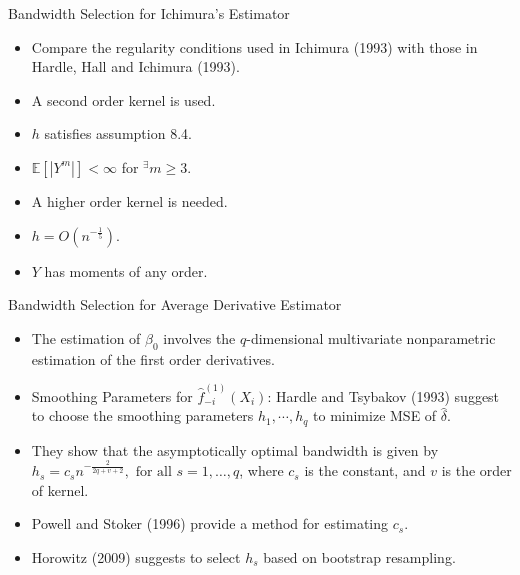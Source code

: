 \documentclass[xcolor=svgnames,dvipdfmx,cjk]{beamer}
\theoremstyle{example}
\def\E{\mathbb{E}}
\begin{document}
\begin{frame}{Bandwidth Selection for Ichimura's Estimator}
  \begin{itemize}
    \item Compare the regularity conditions used in Ichimura (1993) with those in Hardle, Hall and Ichimura (1993).
  \end{itemize}
  \begin{minipage}{0.49\textwidth}  %
    \begin{tcolorbox}[colframe=red!50!white, colback=red!10!white, title=Ichimura (1993)]
        \begin{itemize}
          \item A second order kernel is used.
          \item $h$ satisfies assumption 8.4.
          \item $\E[|Y^m|]<\infty$ for $^\exists m \geq 3$.
        \end{itemize}
    \end{tcolorbox}
  \end{minipage}%
  \hfill
  \begin{minipage}{0.49\textwidth}  %
    \begin{tcolorbox}[colframe=red!50!white, colback=red!10!white, title=HHI (1993)]
        \begin{itemize}
            \item A higher order kernel is needed.
            \item $h = O(n^{-\frac{1}{5}})$.
            \item $Y$ has moments of any order.
        \end{itemize}
    \end{tcolorbox}
  \end{minipage} 
\end{frame}

\begin{frame}{Bandwidth Selection for Average Derivative Estimator}
\begin{itemize}
  \item The estimation of $\beta_0$ involves 
        the $q$-dimensional multivariate nonparametric estimation of the first order derivatives.
  \item \alert{Smoothing Parameters for $\hat{f}_{-i}^{(1)}(X_i)$}: 
        Hardle and Tsybakov (1993) suggest 
        to choose the smoothing parameters $h_1, \cdots, h_q$ 
        to minimize MSE of $\hat{\delta}$.
  \item They show that the asymptotically optimal bandwidth is given by 
        $h_s = c_s n^{-\frac{2}{2q+v+2}}, \text{ for all } s = 1, \dots, q$, 
        where $c_s$ is the constant, and $v$ is the order of kernel.
  \item Powell and Stoker (1996) provide a method for estimating $c_s$.
  \item Horowitz (2009) suggests to select $h_s$ based on bootstrap resampling.
\end{itemize}
\end{frame}
\end{document}
